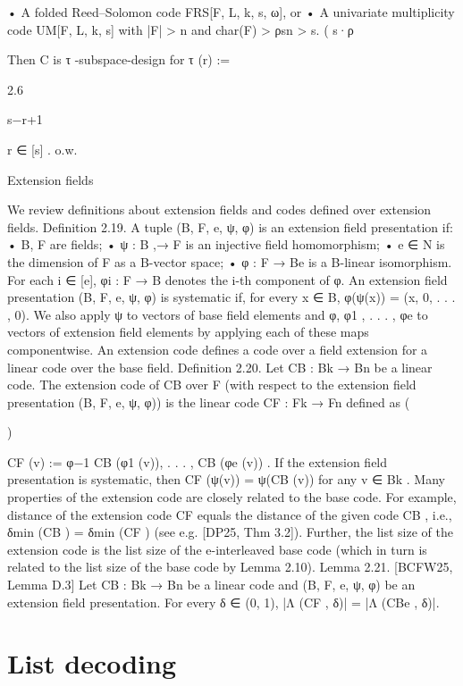 \documentclass[11pt]{article}
\begin{document}
• A folded Reed–Solomon code FRS[F, L, k, s, ω], or
• A univariate multiplicity code UM[F, L, k, s] with |F| > n and char(F) > ρsn > s.
( s·ρ

Then C is τ -subspace-design for τ (r) :=

2.6

s−r+1


r ∈ [s]
.
o.w.

Extension fields

We review definitions about extension fields and codes defined over extension fields.
Definition 2.19. A tuple (B, F, e, ψ, φ) is an extension field presentation if:
• B, F are fields;
• ψ : B ,→ F is an injective field homomorphism;
• e ∈ N is the dimension of F as a B-vector space;
• φ : F → Be is a B-linear isomorphism.
For each i ∈ [e], φi : F → B denotes the i-th component of φ. An extension field presentation
(B, F, e, ψ, φ) is systematic if, for every x ∈ B, φ(ψ(x)) = (x, 0, . . . , 0).
We also apply ψ to vectors of base field elements and φ, φ1 , . . . , φe to vectors of extension field
elements by applying each of these maps componentwise.
An extension code defines a code over a field extension for a linear code over the base field.
Definition 2.20. Let CB : Bk → Bn be a linear code. The extension code of CB over F (with
respect to the extension field presentation (B, F, e, ψ, φ)) is the linear code CF : Fk → Fn defined as
(

)

CF (v) := φ−1 CB (φ1 (v)), . . . , CB (φe (v)) .
If the extension field presentation is systematic, then CF (ψ(v)) = ψ(CB (v)) for any v ∈ Bk .
Many properties of the extension code are closely related to the base code. For example,
distance of the extension code CF equals the distance of the given code CB , i.e., δmin (CB ) = δmin (CF )
(see e.g. [DP25, Thm 3.2]).
Further, the list size of the extension code is the list size of the e-interleaved base code (which
in turn is related to the list size of the base code by Lemma 2.10).
Lemma 2.21. [BCFW25, Lemma D.3] Let CB : Bk → Bn be a linear code and (B, F, e, ψ, φ) be an
extension field presentation. For every δ ∈ (0, 1), |Λ (CF , δ)| = |Λ (CBe , δ)|.


\section{List decoding}
\end{document}
